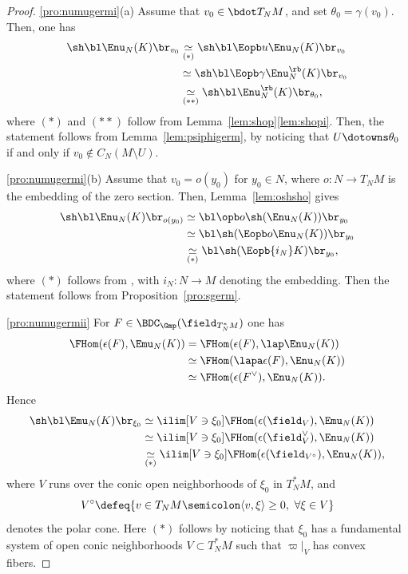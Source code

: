 \skpt
\begin{proof}
\eqref{pro:numugermi}(a) Assume that $v_0\in\bdot T_NM$, and set $\theta_0=\gamma(v_0)$. Then, one has
\begin{align*}
\sh\bl\Enu_N(K)\br_{v_0}
&\underset{(*)}\simeq \sh\bl\Eopb u\Enu_N(K)\br_{v_0} \\
&\simeq \sh\bl\Eopb \gamma\Enu^\rb_N(K)\br_{v_0} \\
&\underset{(**)}\simeq \sh\bl\Enu^\rb_N(K)\br_{\theta_0},
\end{align*}
where $(*)$ and $(**)$ follow from Lemma~\ref{lem:shop}\eqref{lem:shopi}.
Then, the statement follows from Lemma~\ref{lem:psiphigerm}, by noticing
that $U\dotowns \theta_0$ if and only if $v_0\notin C_N(M\setminus U)$.

\eqref{pro:numugermi}(b)
Assume that $v_0=o(y_0)$ for $y_0\in N$, where $o\colon N\to T_NM$ is the embedding of the zero section. Then, Lemma~\ref{lem:oshsho} gives
\begin{align*}
\sh\bl\Enu_N(K)\br_{o(y_0)}
&\simeq \bl\opb o \sh(\Enu_N(K))\br_{y_0} \\
&\simeq \bl \sh(\Eopb o\Enu_N(K))\br_{y_0} \\
&\underset{(*)}\simeq \bl \sh(\Eopb {i_N}K)\br_{y_0},
\end{align*}
where $(*)$ follows from \cite[Lem.\,4.8(i)]{DK19nu}, with $i_N\colon N\to M$ denoting the embedding.
Then the statement follows from Proposition~\ref{pro:sgerm}.

\eqref{pro:numugermii}
For $F\in\BDC_{\Gmp}(\field_{T^*_NM})$ one has
\begin{align*}
\FHom(\epsilon(F),\Emu_N(K))
&= \FHom(\epsilon(F),\lap\Enu_N(K)) \\
&\simeq \FHom(\lapa \epsilon(F),\Enu_N(K)) \\
&\simeq \FHom(\epsilon(F^\vee),\Enu_N(K)).
\end{align*}
Hence
\begin{align*}
\sh\bl\Emu_N(K)\br_{\xi_0}
&\simeq \ilim[V\owns\xi_0] \FHom(\epsilon(\field_V),\Emu_N(K)) \\
&\simeq \ilim[V\owns\xi_0] \FHom(\epsilon(\field_V^\vee),\Enu_N(K)) \\
&\underset{(*)}\simeq \ilim[V\owns\xi_0] \FHom(\epsilon(\field_{V^\circ}),\Enu_N(K)) ,
\end{align*}
where $V$ runs over the conic open neighborhoods of $\xi_0$ in $T^*_NM$,
and
\[
V^\circ \defeq \{v\in T_NM \semicolon \langle v,\xi \rangle \geq 0, \ \forall
\xi\in V \}
\]
denotes the polar cone.
Here $(*)$ follows by noticing that
$\xi_0$ has a fundamental system of open conic neighborhoods $V\subset T^*_NM$ such that $\varpi|_V$ has convex fibers.


\end{proof}
